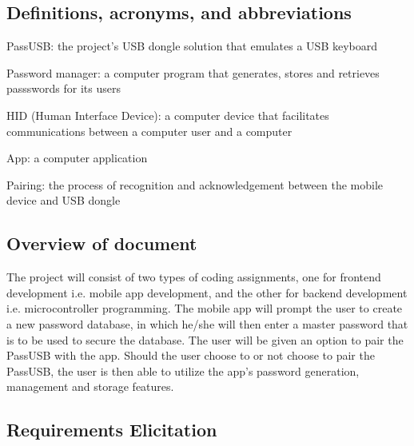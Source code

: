\documentclass[stu]{apa7}
\begin{document}
\subsection{Definitions, acronyms, and abbreviations}

\begin{APAitemize}
  \item PassUSB: the project's USB dongle solution that emulates a USB keyboard
  \item Password manager: a computer program that generates, stores and retrieves passswords for its users
  \item HID (Human Interface Device): a computer device that facilitates communications between a computer user and a computer 
  \item App: a computer application
  \item Pairing: the process of recognition and acknowledgement between the mobile device and USB dongle
\end{APAitemize}

\subsection{Overview of document}
The project will consist of two types of coding assignments, one for frontend development i.e. mobile app development, and the other for backend development i.e. microcontroller programming. The mobile app will prompt the user to create a new password database, in which he/she will then enter a master password that is to be used to secure the database. The user will be given an option to pair the PassUSB with the app. Should the user choose to or not choose to pair the PassUSB, the user is then able to utilize the app's password generation, management and storage features.


\subsection{Requirements Elicitation}
\end{document}
